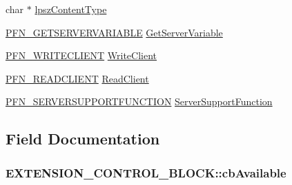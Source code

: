 \begin{DoxyCompactItemize}
char $\ast$ \hyperlink{structEXTENSION__CONTROL__BLOCK_a35d398b489ec8398f272dfba08963e45}{lpsz\+Content\+Type}
\item 
\hyperlink{group__MOD__ISAPI_ga319435ec705ca43111348214b8f35c28}{P\+F\+N\+\_\+\+G\+E\+T\+S\+E\+R\+V\+E\+R\+V\+A\+R\+I\+A\+B\+LE} \hyperlink{structEXTENSION__CONTROL__BLOCK_a06480e9c72f0f3031d23c97991e002bf}{Get\+Server\+Variable}
\item 
\hyperlink{group__MOD__ISAPI_ga758c7d2ac6216c22ab738d335874fc91}{P\+F\+N\+\_\+\+W\+R\+I\+T\+E\+C\+L\+I\+E\+NT} \hyperlink{structEXTENSION__CONTROL__BLOCK_a13dc4eb99391fed13f09cf99c6913318}{Write\+Client}
\item 
\hyperlink{group__MOD__ISAPI_ga82b868f4281793cc507027a7251b3ae9}{P\+F\+N\+\_\+\+R\+E\+A\+D\+C\+L\+I\+E\+NT} \hyperlink{structEXTENSION__CONTROL__BLOCK_a87fae198692bed4cb20f2488d54dddd6}{Read\+Client}
\item 
\hyperlink{group__MOD__ISAPI_ga0283669808e737dad3591ba97bb3f89d}{P\+F\+N\+\_\+\+S\+E\+R\+V\+E\+R\+S\+U\+P\+P\+O\+R\+T\+F\+U\+N\+C\+T\+I\+ON} \hyperlink{structEXTENSION__CONTROL__BLOCK_afc8d0ca627d7ea7c0389cedb0a10250e}{Server\+Support\+Function}
\end{DoxyCompactItemize}


\subsection{Field Documentation}
\subsubsection[{\texorpdfstring{cb\+Available}{cbAvailable}}]{ E\+X\+T\+E\+N\+S\+I\+O\+N\+\_\+\+C\+O\+N\+T\+R\+O\+L\+\_\+\+B\+L\+O\+C\+K\+::cb\+Available}\hypertarget{structEXTENSION__CONTROL__BLOCK_a778710ce20c2082daa4c5421adac3a6b}{}\label{structEXTENSION__CONTROL__BLOCK_a778710ce20c2082daa4c5421adac3a6b}
